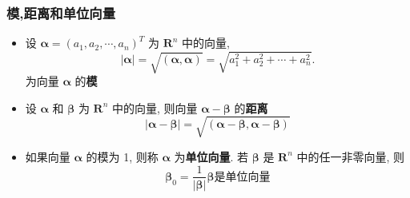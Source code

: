 \documentclass{article}
\begin{document}
				\subsubsection*{模,距离和单位向量}
				\begin{itemize}
					\item 设 $\boldsymbol{\alpha}=\left(a_{1}, a_{2}, \cdots, a_{n}\right)^{T}$ 为 $\mathbf{R}^{n}$ 中的向量,
					$$
					|\boldsymbol{\alpha}|=\sqrt{(\boldsymbol{\alpha}, \boldsymbol{\alpha})}=\sqrt{a_{1}^{2}+a_{2}^{2}+\cdots+a_{n}^{2}} .
					$$
					为向量 $\boldsymbol{\alpha}$ 的\textbf{模}
					\item 设 $\boldsymbol\alpha$ 和 $\boldsymbol\beta$ 为 $\mathbf{R}^{n}$ 中的向量, 则向量 $\boldsymbol\alpha-\boldsymbol\beta$ 的\textbf{距离}
					$$
					|\boldsymbol{\alpha}-\boldsymbol{\beta}|=\sqrt{(\boldsymbol{\alpha}-\boldsymbol{\beta}, \boldsymbol{\alpha}-\boldsymbol{\beta})}
					$$
					\item 如果向量 $\boldsymbol{\alpha}$ 的模为 1, 则称 $\boldsymbol{\alpha}$ 为\textbf{单位向量}. 若 $\boldsymbol{\beta}$ 是 $\mathbf{R}^{n}$ 中的任一非零向量, 则
					$$
					\boldsymbol{\beta}_{0}=\frac{1}{|\boldsymbol{\beta}|} \boldsymbol{\beta}\text{是单位向量}
					$$
				\end{itemize}
\end{document}
